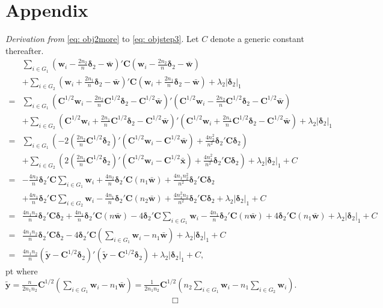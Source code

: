 \documentclass[12pt]{article}
\begin{document}




\clearpage
\section*{Appendix}
\textit{Derivation from} \eqref{eq: obj2more} to \eqref{eq: objstep3}.
Let $C$ denote a generic constant thereafter.
\begin{align*}
&\sum\limits_{i\in G_1}(\bm w_i-\frac{2n_2}{n}\bm \delta_2-\bar{\bm w})'\bm C(\bm w_i-\frac{2n_2}{n}\bm \delta_2-\bar{\bm w})\\
&+\sum\limits_{i \in G_2}(\bm w_i+\frac{2n_1}{n}\bm \delta_2-\bar{\bm w})'\bm C(\bm w_i+\frac{2n_1}{n}\bm \delta_2-\bar{\bm w})+\lambda_2|\bm \delta_2|_1\\
=&\sum_{i\in G_1}(\bm C^{1/2}\bm w_i-\frac{2n_2}{n}\bm C^{1/2}\bm \delta_2-\bm C^{1/2}\bar{\bm w})'(\bm C^{1/2}\bm w_i-\frac{2n_2}{n}\bm C^{1/2}\bm \delta_2-\bm C^{1/2}\bar{\bm w})\\
&+\sum_{i\in G_2}(\bm C^{1/2}\bm w_i+\frac{2n_1}{n}\bm C^{1/2}\bm \delta_2-\bm C^{1/2}\bar{\bm w})'(\bm C^{1/2}\bm w_i+\frac{2n_1}{n}\bm C^{1/2}\bm \delta_2-\bm C^{1/2}\bar{\bm w})+\lambda_2|\bm \delta_2|_1\\
= &\sum\limits_{i\in G_1}(-2(\frac{2n_2}{n}\bm C^{1/2}\bm \delta_2)'(\bm C^{1/2}\bm w_i-\bm C^{1/2}\bar{\bm w})+\frac{4n_2^2}{n^2}\bm \delta_2'\bm C\bm \delta_2)\\
&+\sum\limits_{i\in G_2}(2(\frac{2n_1}{n}\bm C^{1/2}\bm \delta_2)'(\bm C^{1/2}\bm w_i-\bm C^{1/2}\bar{\bm x})+\frac{4n_1^2}{n^2}\bm \delta_2'\bm C\bm \delta_2)+\lambda_2|\bm \delta_2|_1 + C \\
=&-\frac{4n_2}{n}\bm \delta_2'\bm C\sum_{i\in G_1}\bm w_i+\frac{4n_2}{n}\bm \delta_2' \bm C(n_1\bar{\bm w})+\frac{4n_1n_2^2}{n^2}\bm \delta_2'\bm C\bm \delta_2\\
&+\frac{4n_1}{n}\bm \delta_2'\bm C\sum_{i\in G_2}\bm w_i-\frac{4n_1}{n}\bm \delta_2' \bm C(n_2\bar{\bm w})+\frac{4n_1^2n_2}{n^2}\bm \delta_2'\bm C\bm \delta_2+\lambda_2|\bm \delta_2|_1 + C \\
=&\frac{4n_1n_2}{n}\bm \delta_2'\bm C\bm \delta_2+\frac{4n_1}{n}\bm \delta_2'\bm C(n\bar{\bm w})-4\bm \delta_2'\bm C\sum_{i\in G_1}\bm w_i-\frac{4n_1}{n}\bm \delta_2'\bm C(n\bar{\bm w})        +4\bm \delta_2'\bm C(n_1\bar{\bm w}) + \lambda_2|\bm \delta_2|_1 + C   \\
=&\frac{4n_1n_2}{n}\bm \delta_2'\bm C\bm \delta_2-4\bm \delta_2'\bm C(\sum_{i \in G_1}\bm w_i-n_1\bar{\bm w})+\lambda_2|\bm \delta_2|_1 + C \\
= &\frac{4n_1n_2}{n}(\tilde{\bm y}-\bm C^{1/2}\bm \delta_2)'(\tilde{\bm y} - \bm C^{1/2} \bm \delta_2)+\lambda_2|\bm \delta_2|_1 + C,
\end{align*}
 pt
\noindent where $\tilde{\bm y}=\frac{n}{2n_1n_2}\bm C^{1/2}(\sum\limits_{i \in G_1}\bm w_i-n_1\bar{\bm w}) = \frac{1}{2n_1n_2}\bm C^{1/2}(n_2\sum\limits_{i \in G_1}\bm w_i - n_1\sum\limits_{i \in G_2}\bm w_i)$.
~~~~~~~~~~~~~~~~~~~~~~~~~~~~~~~~~~~~~~~$\Box$
\end{document}
